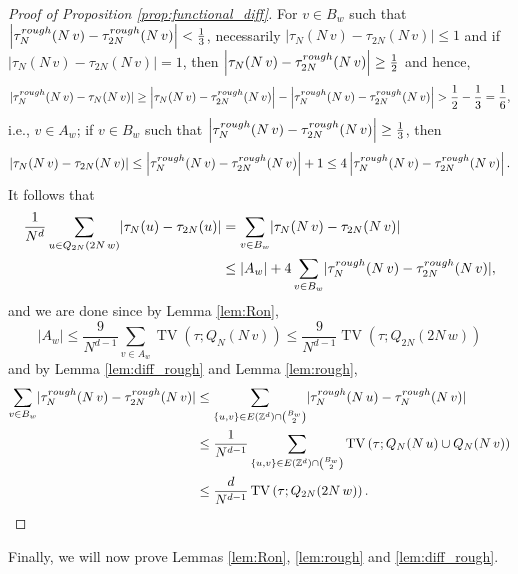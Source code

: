 \documentclass[11pt, reqno]{amsart}
\newcommand{\Z}{\mathbb{Z}}
\DeclareMathOperator{\TV}{TV}
\numberwithin{equation}{section}
\begin{document}
\begin{proof}[Proof of Proposition \ref{prop:functional_diff}]
For $v\in B_w$ such that $\left\lvert\tau^{\rm rough}_N(N\,v)-\tau^{\rm rough}_{2N}(N\,v)\right\rvert<\frac{1}{3}$, necessarily $\left\lvert\tau_N(N\,v)-\tau_{2N}(N\,v)\right\rvert\leq 1$ and if 
$\left\lvert\tau_N(N\,v)-\tau_{2N}(N\,v)\right\rvert=1$, then $\left\lvert\tau_N(N\,v)-\tau^{\rm rough}_{2N}(N\,v)\right\rvert\geq\frac{1}{2}$ and hence,
$$
\lvert\tau^{\rm rough}_N(N\,v)-\tau_N(N\,v)\rvert\geq \left\lvert\tau_N(N\,v)-\tau^{\rm rough}_{2N}(N\,v)\right\rvert-\left\lvert\tau^{\rm rough}_N(N\,v)-\tau^{\rm rough}_{2N}(N\,v)\right\rvert>\frac{1}{2}-\frac{1}{3}=\frac{1}{6},
$$
i.e., $v\in A_w$;
if $v\in B_w$ such that
$\left\lvert\tau^{\rm rough}_N(N\,v)-\tau^{\rm rough}_{2N}(N\,v)\right\rvert\geq\frac{1}{3}$, then 
$$
\left\lvert\tau_N(N\,v)-\tau_{2N}(N\,v)\right\rvert\leq \left\lvert\tau^{\rm rough}_N(N\,v)-\tau^{\rm rough}_{2N}(N\,v)\right\rvert+1\leq 4\left\lvert\tau^{\rm rough}_N(N\,v)-\tau^{\rm rough}_{2N}(N\,v)\right\rvert.$$
It follows that
\begin{align*}
\frac{1}{N^d}\sum_{u\in Q_{2N}(2N\,w)}\lvert\tau_N(u)-\tau_{2N}(u)\rvert&=
\sum_{v\in B_w}\lvert\tau_N(N\,v)-\tau_{2N}(N\,v)\rvert\\
&\leq \lvert A_w\rvert+
4\sum_{v\in B_w}\lvert\tau^{\rm rough}_N(N\,v)-\tau^{\rm rough}_{2N}(N\,v)\rvert,
\end{align*}
and we are done since by Lemma \ref{lem:Ron}, $$\lvert A_w\rvert\leq \frac{9}{N^{d-1}}\sum_{v\in A_w}\TV\left(\tau; Q_N(N\,v)\right)\leq \frac{9}{N^{d-1}}\TV\left(\tau; Q_{2N}(2N\,w)\right)$$
and by Lemma \ref{lem:diff_rough} and Lemma \ref{lem:rough}, 
\begin{align*}
\sum_{v\in B_w}\lvert\tau^{\rm rough}_N(N\,v)-\tau^{\rm rough}_{2N}(N\,v)\rvert&\leq\sum_{\{u,v\}\in E(\Z^d)\cap\binom{B_w}{2}}\lvert\tau^{\rm rough}_N(N\,u)-\tau^{\rm rough}_N(N\,v)\rvert\\
&\leq \frac{1}{N^{d-1}}\sum_{\{u,v\}\in E(\Z^d)\cap\binom{B_w}{2}}\TV\left(\tau; Q_N(N\,u)\cup Q_N(N\,v)\right)\\
&\leq \frac{d}{N^{d-1}}\TV\left(\tau; Q_{2N}(2N\,w)\right).\qedhere\end{align*}
\end{proof}

Finally, we will now prove Lemmas \ref{lem:Ron}, \ref{lem:rough} and \ref{lem:diff_rough}.
\end{document}
